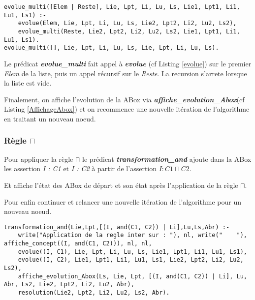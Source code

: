 \documentclass{rapportECL}
\begin{document}
\begin{lstlisting}[style=prologStyle, caption={Évolution de la ABox à partir d'une liste assertion}, label={evolue_multi}]
evolue_multi([Elem | Reste], Lie, Lpt, Li, Lu, Ls, Lie1, Lpt1, Li1, Lu1, Ls1) :-
    evolue(Elem, Lie, Lpt, Li, Lu, Ls, Lie2, Lpt2, Li2, Lu2, Ls2),
    evolue_multi(Reste, Lie2, Lpt2, Li2, Lu2, Ls2, Lie1, Lpt1, Li1, Lu1, Ls1).
evolue_multi([], Lie, Lpt, Li, Lu, Ls, Lie, Lpt, Li, Lu, Ls).
\end{lstlisting}

Le prédicat \textbf{\textit{evolue\_multi}} fait appel à \textbf{\textit{evolue}} (cf Listing \ref{evolue}) sur le premier \textit{Elem} de la liste, puis un appel récursif sur le \textit{Reste}. La recursion s'arrete lorsque la liste est vide.

Finalement, on affiche l'evolution de la ABox via \textbf{\textit{affiche\_evolution\_Abox}}(cf Listing \ref{AffichageAbox}) et on recommence une nouvelle itération de l'algorithme en traitant un nouveau noeud.

\newpage

\subsubsection{Règle  \(\sqcap\)}

Pour appliquer la règle \textit{\( \sqcap \)} le prédicat \textbf{\textit{transformation\_and}} ajoute dans la ABox les assertion \textit{I : C1} et \textit{I : C2} à partir de l'assertion \textit{\( I : C1 \sqcap C2 \)}.

Et affiche l'état des ABox de départ et son état après l'application de la règle \textit{\(\sqcap\)}.

Pour enfin continuer et relancer une nouvelle itération de l'algorithme pour un nouveau noeud.

\begin{lstlisting}[style=prologStyle, caption={Application de la regle \(\sqcap\)}, label={and}]
transformation_and(Lie,Lpt,[(I, and(C1, C2)) | Li],Lu,Ls,Abr) :-
    write("Application de la regle inter sur : "), nl, write("    "), affiche_concept((I, and(C1, C2))), nl, nl,
    evolue((I, C1), Lie, Lpt, Li, Lu, Ls, Lie1, Lpt1, Li1, Lu1, Ls1),
    evolue((I, C2), Lie1, Lpt1, Li1, Lu1, Ls1, Lie2, Lpt2, Li2, Lu2, Ls2),
    affiche_evolution_Abox(Ls, Lie, Lpt, [(I, and(C1, C2)) | Li], Lu, Abr, Ls2, Lie2, Lpt2, Li2, Lu2, Abr),
    resolution(Lie2, Lpt2, Li2, Lu2, Ls2, Abr).
\end{lstlisting}
\end{document}
